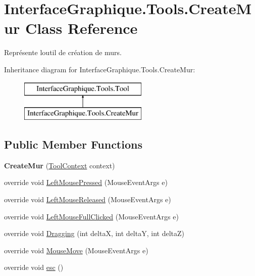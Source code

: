 \hypertarget{class_interface_graphique_1_1_tools_1_1_create_mur}{}\section{Interface\+Graphique.\+Tools.\+Create\+Mur Class Reference}
\label{class_interface_graphique_1_1_tools_1_1_create_mur}


Représente l\textquotesingle{}outil de création de murs.  


Inheritance diagram for Interface\+Graphique.\+Tools.\+Create\+Mur\+:\begin{figure}[H]
\begin{center}
\leavevmode
\includegraphics[height=2.000000cm]{class_interface_graphique_1_1_tools_1_1_create_mur}
\end{center}
\end{figure}
\subsection*{Public Member Functions}
\begin{DoxyCompactItemize}
\item 
\hypertarget{class_interface_graphique_1_1_tools_1_1_create_mur_abeb4c3641b9c6677ecc4fb9e7bdbcb6b}{}{\bfseries Create\+Mur} (\hyperlink{class_interface_graphique_1_1_tools_1_1_tool_context}{Tool\+Context} context)\label{class_interface_graphique_1_1_tools_1_1_create_mur_abeb4c3641b9c6677ecc4fb9e7bdbcb6b}

\item 
override void \hyperlink{class_interface_graphique_1_1_tools_1_1_create_mur_a79a1a1f1865df9234e4bd1415ed6b52f}{Left\+Mouse\+Pressed} (Mouse\+Event\+Args e)
\item 
override void \hyperlink{class_interface_graphique_1_1_tools_1_1_create_mur_a663d5c347bf63a1324605eb552c58a19}{Left\+Mouse\+Released} (Mouse\+Event\+Args e)
\item 
override void \hyperlink{class_interface_graphique_1_1_tools_1_1_create_mur_affaacf9919134693a0fc44fe246d4b8c}{Left\+Mouse\+Full\+Clicked} (Mouse\+Event\+Args e)
\item 
override void \hyperlink{class_interface_graphique_1_1_tools_1_1_create_mur_a7ffdf69b104fda7ebdaef67f9ac03582}{Dragging} (int delta\+X, int delta\+Y, int delta\+Z)
\item 
override void \hyperlink{class_interface_graphique_1_1_tools_1_1_create_mur_abe8d1a32d61c3057490450bf9ff2b17c}{Mouse\+Move} (Mouse\+Event\+Args e)
\item 
override void \hyperlink{class_interface_graphique_1_1_tools_1_1_create_mur_a26837d6c8d1fa58b035fb696396fc451}{esc} ()
\end{DoxyCompactItemize}
